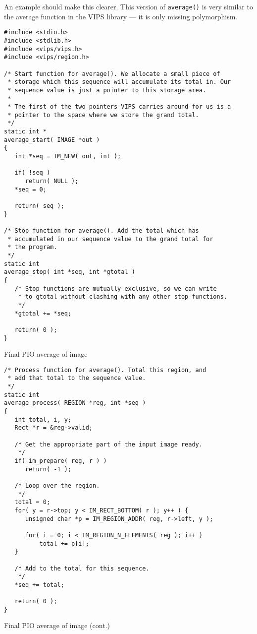 An example should make this clearer. This version of \verb+average()+
is very similar to the average function in the VIPS library --- it is only
missing polymorphism.

\begin{fig2}
\begin{verbatim}
#include <stdio.h>
#include <stdlib.h>
#include <vips/vips.h>
#include <vips/region.h>

/* Start function for average(). We allocate a small piece of
 * storage which this sequence will accumulate its total in. Our
 * sequence value is just a pointer to this storage area.
 *
 * The first of the two pointers VIPS carries around for us is a
 * pointer to the space where we store the grand total.
 */
static int *
average_start( IMAGE *out )
{
   int *seq = IM_NEW( out, int );

   if( !seq )
      return( NULL );
   *seq = 0;

   return( seq );
}

/* Stop function for average(). Add the total which has 
 * accumulated in our sequence value to the grand total for 
 * the program.
 */
static int
average_stop( int *seq, int *gtotal )
{
   /* Stop functions are mutually exclusive, so we can write 
    * to gtotal without clashing with any other stop functions.
    */
   *gtotal += *seq;

   return( 0 );
}
\end{verbatim}
\caption{Final PIO average of image}
\label{fg:p2average}
\end{fig2}

\begin{fig2}
\begin{verbatim}
/* Process function for average(). Total this region, and 
 * add that total to the sequence value.
 */
static int
average_process( REGION *reg, int *seq )
{
   int total, i, y;
   Rect *r = &reg->valid;

   /* Get the appropriate part of the input image ready.
    */
   if( im_prepare( reg, r ) )
      return( -1 ); 

   /* Loop over the region.
    */
   total = 0;
   for( y = r->top; y < IM_RECT_BOTTOM( r ); y++ ) {
      unsigned char *p = IM_REGION_ADDR( reg, r->left, y );

      for( i = 0; i < IM_REGION_N_ELEMENTS( reg ); i++ )
          total += p[i];
   }

   /* Add to the total for this sequence.
    */
   *seq += total;

   return( 0 );
}
\end{verbatim}
\caption{Final PIO average of image (cont.)}
\end{fig2}

